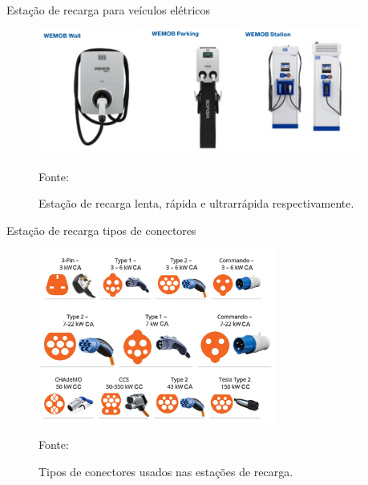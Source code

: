 \documentclass{beamer}
\begin{document}

\begin{frame}{Estação de recarga para veículos elétricos}

\begin{figure}[H]
    \centering
    \includegraphics[width=0.95\textwidth]{./Figuras/etacoes_recarga.png}
    \caption{Estação de recarga lenta, rápida e ultrarrápida respectivamente.}{Fonte: \cite{weg_estacao}}
   \label{fig:etacoes_recarga}
\end{figure}

\end{frame}


\begin{frame}{Estação de recarga tipos de conectores}

\begin{figure}[H]
    \centering
    \includegraphics[width=0.7\textwidth]{./Figuras/chargers.png}
    \caption{Tipos de conectores usados nas estações de recarga.}{Fonte: \cite{ev_conect_zap}}
   \label{fig:fast_chargers}
\end{figure}

\end{frame}

\end{document}
